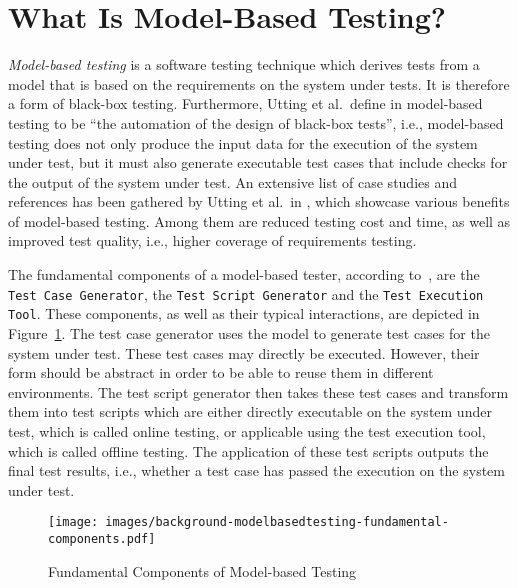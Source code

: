 \section{What Is Model-Based Testing?}
\label{sec:whatIsModelBasedTesting}

\emph{Model-based testing} is a software testing technique which derives tests from a model that is based on the requirements on the system under tests. It is therefore a form of black-box testing. Furthermore, Utting et al.~define in \cite{utting2010practical} model-based testing to be \enquote{the automation of the design of black-box tests}, i.e., model-based testing does not only produce the input data for the execution of the system under test, but it must also generate executable test cases that include checks for the output of the system under test. An extensive list of case studies and references has been gathered by Utting et al.~in \cite{utting2010practical}, which showcase various benefits of model-based testing. Among them are reduced testing cost and time, as well as improved test quality, i.e., higher coverage of requirements testing.

The fundamental components of a model-based tester, according to~\cite{utting2010practical}, are the \texttt{Test Case Generator}, the \texttt{Test Script Generator} and the \texttt{Test Execution Tool}. These components, as well as their typical interactions, are depicted in Figure~\ref{fig:backgroundModelBasedTestingFundamentalComponents}. The test case generator uses the model to generate test cases for the system under test. These test cases may directly be executed. However, their form should be abstract in order to be able to reuse them in different environments. The test script generator then takes these test cases and transform them into test scripts which are either directly executable on the system under test, which is called online testing, or applicable using the test execution tool, which is called offline testing. The application of these test scripts outputs the final test results, i.e., whether a test case has passed the execution on the system under test.

\begin{figure}[t]
\texttt{[image: images/background-modelbasedtesting-fundamental-components.pdf]}
\caption{Fundamental Components of Model-based Testing}
\label{fig:backgroundModelBasedTestingFundamentalComponents}
\end{figure}

